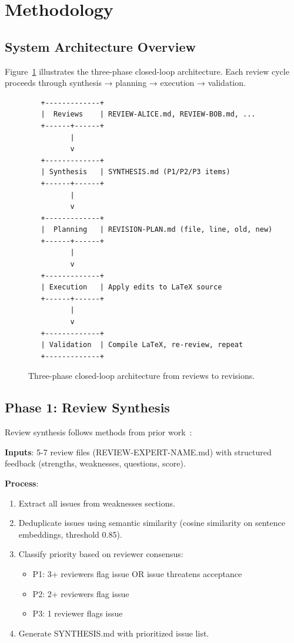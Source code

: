 \section{Methodology}
\label{sec:method}

\subsection{System Architecture Overview}

Figure~\ref{fig:architecture} illustrates the three-phase closed-loop architecture. Each review cycle proceeds through synthesis → planning → execution → validation.

\begin{figure}[t]
\centering
\begin{verbatim}
   +-------------+
   |  Reviews    | REVIEW-ALICE.md, REVIEW-BOB.md, ...
   +------+------+
          |
          v
   +-------------+
   | Synthesis   | SYNTHESIS.md (P1/P2/P3 items)
   +------+------+
          |
          v
   +-------------+
   |  Planning   | REVISION-PLAN.md (file, line, old, new)
   +------+------+
          |
          v
   +-------------+
   | Execution   | Apply edits to LaTeX source
   +------+------+
          |
          v
   +-------------+
   | Validation  | Compile LaTeX, re-review, repeat
   +-------------+
\end{verbatim}
\caption{Three-phase closed-loop architecture from reviews to revisions.}
\label{fig:architecture}
\end{figure}

\subsection{Phase 1: Review Synthesis}

Review synthesis follows methods from prior work~\cite{dellalibera2026synthesis}:

\textbf{Inputs}: 5-7 review files (REVIEW-EXPERT-NAME.md) with structured feedback (strengths, weaknesses, questions, score).

\textbf{Process}:
\begin{enumerate}
\item Extract all issues from weaknesses sections.
\item Deduplicate issues using semantic similarity (cosine similarity on sentence embeddings, threshold 0.85).
\item Classify priority based on reviewer consensus:
  \begin{itemize}
  \item P1: 3+ reviewers flag issue OR issue threatens acceptance
  \item P2: 2+ reviewers flag issue
  \item P3: 1 reviewer flags issue
  \end{itemize}
\item Generate SYNTHESIS.md with prioritized issue list.
\end{enumerate}

